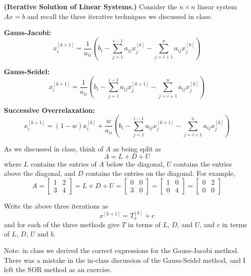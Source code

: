 \textbf{(Iterative Solution of Linear Systems.)} Consider the $n \times n$
linear system $Ax=b$ and recall the three iterative techniques we
discussed in class:

\textbf{Gauss-Jacobi:}
\[
x_i^{[k+1]} = \frac{1}{a_{ii}} \left( b_i - \sum_{j=1}^{i-1} a_{ij}
x_j^{[k]} - \sum_{j=i+1}^n a_{ij} x_j^{[k]} \right)
\]

\textbf{Gauss-Seidel:}
\[
x_i^{[k+1]} = \frac{1}{a_{ii}} \left(
b_i - \sum_{j=1}^{i-1} a_{ij} x_j^{[k+1]} - \sum_{j=i+1}^n a_{ij} x_j^{[k]}
\right)
\]

\textbf{Successive Overrelaxation:}
\[
x_i^{[k+1]} =
(1 - w)x_i^{[k]} + \frac{w}{a_{ii}}
\left(
b_i - \sum_{j=1}^{i-1} a_{ij} x_j^{[k+1]} - \sum_{j=i+1}^n a_{ij} x_j^{[k]}
\right)
\]

As we discussed in class, think of $A$ as being split as
\[
A = L + D + U
\]
where $L$ contains the entries of $A$ below the diagonal, $U$ contains
the entries above the diagonal, and $D$ contains the entries on the
diagonal. For example,
\[
A
= \left[\begin{matrix} 1 & 2 \\ 3 & 4 \end{matrix} \right]
= L + D + U
= \left[\begin{matrix} 0 & 0 \\ 3 & 0 \end{matrix} \right]
= \left[\begin{matrix} 1 & 0 \\ 0 & 4 \end{matrix} \right]
= \left[\begin{matrix} 0 & 2 \\ 0 & 0 \end{matrix} \right]
\]

Write the above three iterations as
\[
x^{[k+1]} = T_x^{[k]} + c
\]
and for each of the three methods give $T$ in terms of $L$, $D$, and
$U$, and $c$ in terms of $L$, $D$, $U$ and $b$.

Note: in class we derived the correct expressions for the Gauss-Jacobi
method. There was a mistake in the in-class discussion of the
Gauss-Seidel method, and I left the SOR method as an exercise.

